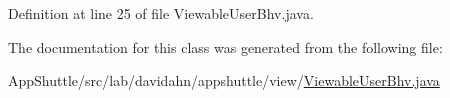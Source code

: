 \-Definition at line 25 of file \-Viewable\-User\-Bhv.\-java.



\-The documentation for this class was generated from the following file\-:\begin{DoxyCompactItemize}
\item 
\-App\-Shuttle/src/lab/davidahn/appshuttle/view/\hyperlink{_viewable_user_bhv_8java}{\-Viewable\-User\-Bhv.\-java}\end{DoxyCompactItemize}
